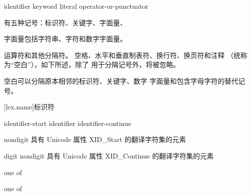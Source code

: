%
\begin{bnf}
\br
    identifier\br
    keyword\br
    literal\br
    operator-or-punctuator
\end{bnf}

\pnum
{}%
有五种记号：标识符、关键字、字面量、%
\begin{footnote}
字面量包括字符串、字符和数字字面量。
\end{footnote}
运算符和其他分隔符。
%
空格、水平和垂直制表符、换行符、换页符和注释
（统称为“空白”），如下所述，除了
用于分隔记号外，将被忽略。
\begin{note}
空白可以分隔原本相邻的标识符、关键字、数字
字面量和包含字母字符的替代记号。
\end{note}

[lex.name]{标识符}

%
\begin{bnf}
\br
    identifier-start\br
    identifier identifier-continue
\end{bnf}

\begin{bnf}
\br
    nondigit\br
    \textnormal{具有 Unicode 属性 XID_Start 的翻译字符集的元素}
\end{bnf}

\begin{bnf}
\br
    digit\br
    nondigit\br
    \textnormal{具有 Unicode 属性 XID_Continue 的翻译字符集的元素}
\end{bnf}

\begin{bnf}
 \textnormal{one of}\br
    \br
    \br
    \br
\end{bnf}

\begin{bnf}
 \textnormal{one of}\br
\end{bnf}

